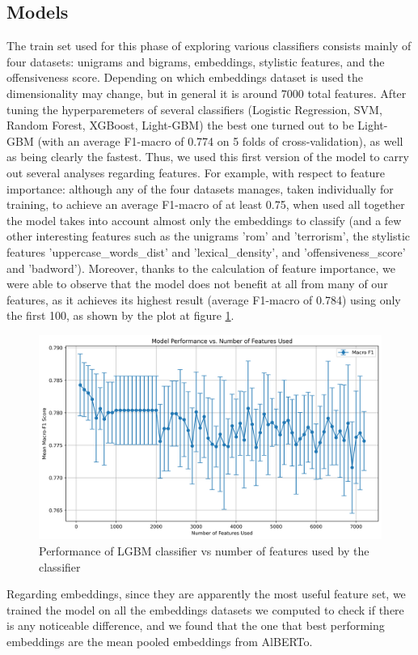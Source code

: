 \subsection{Models}

The train set used for this phase of exploring various classifiers consists mainly of four datasets: unigrams and bigrams, embeddings, stylistic features, and the offensiveness score. Depending on which embeddings dataset is used the dimensionality may change, but in general it is around 7000 total features.
{}
After tuning the hyperparemeters of several classifiers (Logistic Regression, SVM, Random Forest, XGBoost, Light-GBM) the best one turned out to be Light-GBM (with an average F1-macro of 0.774 on 5 folds of cross-validation), as well as being clearly the fastest. Thus, we used this first version of the model to carry out several analyses regarding features.
For example, with respect to feature importance: although any of the four datasets manages, taken individually for training, to achieve an average F1-macro of at least 0.75, when used all together the model takes into account almost only the embeddings to classify (and a few other interesting features such as the unigrams 'rom' and 'terrorism', the stylistic features 'uppercase\_words\_dist' and 'lexical\_density', and 'offensiveness\_score' and 'badword').
Moreover, thanks to the calculation of feature importance, we were able to observe that the model does not benefit at all from many of our features, as it achieves its highest result (average F1-macro of 0.784) using only the first 100, as shown by the plot at figure \ref{fig:features}.

\begin{figure}
    \includegraphics[width=\columnwidth]{../../results/images/model_n_feats.png}
    \caption{Performance of LGBM classifier vs number of features used by the classifier}
    \label{fig:features}
\end{figure}
Regarding embeddings, since they are apparently the most useful feature set, we trained the model on all the embeddings datasets we computed to check if there is any noticeable difference, and we found that the one that best performing embeddings are the mean pooled embeddings from AlBERTo.


